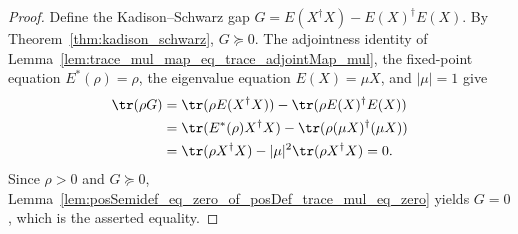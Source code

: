 \begin{proof}
    \leanok
    Define the Kadison--Schwarz gap
    $G=E(X^\dagger X)-E(X)^\dagger E(X)$. By
    Theorem~\ref{thm:kadison_schwarz}, $G\succeq0$. The adjointness identity of
    Lemma~\ref{lem:trace_mul_map_eq_trace_adjointMap_mul}, the fixed-point
    equation $E^*(\rho)=\rho$, the eigenvalue equation $E(X)=\mu X$, and
    $|\mu|=1$ give
    \begin{align}
        \tr(\rho G)
         & =\tr(\rho E(X^\dagger X))
        -\tr(\rho E(X)^\dagger E(X)) \notag     \\
         & =\tr(E^*(\rho)X^\dagger X)
        -\tr(\rho(\mu X)^\dagger(\mu X)) \notag \\
         & =\tr(\rho X^\dagger X)
        -|\mu|^2\tr(\rho X^\dagger X)
        =0.
        \notag
    \end{align}
    Since $\rho>0$ and $G\succeq0$,
    Lemma~\ref{lem:posSemidef_eq_zero_of_posDef_trace_mul_eq_zero} yields
    $G=0$, which is the asserted equality.
\end{proof}
